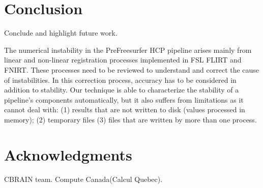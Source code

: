 \documentclass{article}
\begin{document}
\section{Conclusion}

Conclude and highlight future work.

The numerical instability in the PreFreesurfer HCP pipeline arises mainly from linear and non-linear registration processes 
implemented in FSL FLIRT and FNIRT. These processes need to be reviewed to understand and correct the cause of instabilities. 
In this correction process, accuracy has to be considered in addition to stability. Our technique is able to 
characterize the stability of a pipeline’s components automatically, but it also suffers from limitations as it cannot deal with: 
(1) results that are not written to disk (values processed in memory); (2) temporary files (3) files that are written by more than one process.


\section{Acknowledgments}

CBRAIN team. Compute Canada(Calcul Quebec).



\end{document}
